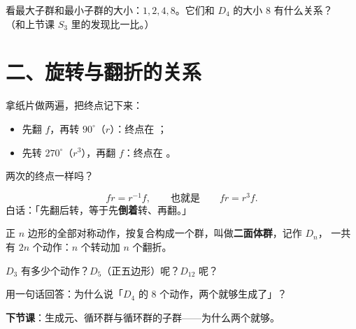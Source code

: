 \begin{sikao}
  看最大子群和最小子群的大小：\(1,2,4,8\)。它们和 \(D_4\) 的大小 \(8\) 有什么关系？\\[4pt]
  （和上节课 \(S_3\) 里的发现比一比。）
\end{sikao}

\section*{二、旋转与翻折的关系}

\begin{dongshou}[左右各走一条路]
  拿纸片做两遍，把终点记下来：
  \begin{itemize}
    \item 先翻 \(f\)，再转 \(90^\circ\)（\(r\)）：终点在 \underline{\hspace{3em}}；
    \item 先转 \(270^\circ\)（\(r^3\)），再翻 \(f\)：终点在 \underline{\hspace{3em}}。
  \end{itemize}
  两次的终点一样吗？\underline{\hspace{3em}}
\end{dongshou}

\begin{example}
  \[
    fr=r^{-1}f, \qquad\text{也就是}\qquad fr=r^3f .
  \]
  白话：「先翻后转，等于先\textbf{倒着}转、再翻。」
\end{example}

\begin{dingli}[二面体群]
  正 \(n\) 边形的全部对称动作，按复合构成一个群，叫做\textbf{二面体群}，记作 \(D_n\)，
  一共有 \(2n\) 个动作：\(n\) 个转动加 \(n\) 个翻折。
\end{dingli}

\begin{sikao}
  \(D_3\) 有多少个动作？\(D_5\)（正五边形）呢？\(D_{12}\) 呢？
\end{sikao}

\begin{xiaojie}
  用一句话回答：为什么说「\(D_4\) 的 \(8\) 个动作，两个就够生成了」？
\end{xiaojie}

\noindent\textbf{下节课}：生成元、循环群与循环群的子群——为什么两个就够。